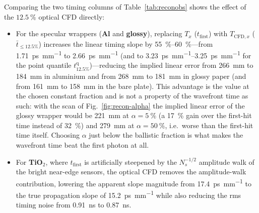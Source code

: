 \documentclass[11pt,a4paper]{article}
\begin{document}
Comparing the two timing columns of Table~\ref{tab:reconobs} shows the effect
of the $\SI{12.5}{\percent}$ optical CFD directly:
\begin{itemize}
  \item For the specular wrappers (\textbf{Al} and \textbf{glossy}), replacing
        $T_x$ ($t_{\mathrm{first}}$) with $T_{\mathrm{CFD},x}$ ($\bar t_{\le 12.5\%}$)
        increases the linear timing slope by \SI{55}{\percent}--\SI{60}{\percent}---from
        \SI{1.71}{\ps\per\mm} to \SI{2.66}{\ps\per\mm} (and to
        \SI{3.23}{\ps\per\mm}--\SI{3.25}{\ps\per\mm} for the point quantile $t^{\mathrm{q}}_{12.5\%}$)---reducing
        the implied linear error from \SI{266}{\milli\meter} to
        \SI{184}{\milli\meter} in aluminium and from \SI{268}{\milli\meter} to
        \SI{181}{\milli\meter} in glossy paper (and from \SI{161}{\milli\meter}
        to \SI{158}{\milli\meter} in the bare plate).  This advantage is the
        value at the chosen constant fraction and is not a property of the
        wavefront time as such: with the scan of Fig.~\ref{fig:recon-alpha} the
        implied linear error of the glossy wrapper would be \SI{221}{\milli\meter}
        at $\alpha = \SI{5}{\percent}$ (a \SI{17}{\percent} gain over the
        first-hit time instead of \SI{32}{\percent}) and \SI{279}{\milli\meter}
        at $\alpha = \SI{50}{\percent}$, i.e.\ worse than the first-hit time
        itself.  Choosing $\alpha$ just below the ballistic fraction is what
        makes the wavefront time beat the first photon at all.
  \item For \textbf{TiO$_2$}, where $t_{\mathrm{first}}$ is artificially
        steepened by the $N_s^{-1/2}$ amplitude walk of the bright near-edge
        sensors, the optical CFD removes the amplitude-walk contribution,
        lowering the apparent slope magnitude from \SI{17.4}{\ps\per\mm} to the
        true propagation slope of \SI{15.2}{\ps\per\mm} while also reducing the
        rms timing noise from \SI{0.91}{\nano\second} to \SI{0.87}{\nano\second}.
\end{itemize}
\end{document}
